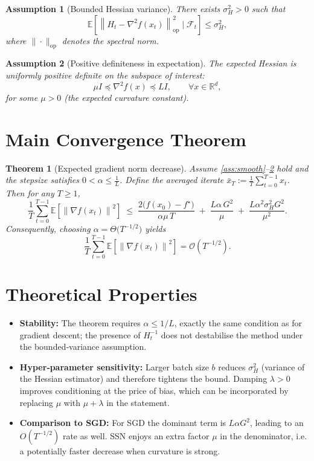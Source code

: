 \documentclass{article}
\newtheorem{assumption}{Assumption}
\newtheorem{theorem}{Theorem}
\newcommand{\E}{\mathbb{E}}
\newcommand{\R}{\mathbb{R}}
\newcommand{\norm}[1]{\left\|#1\right\|}
\begin{document}
\begin{assumption}[Bounded Hessian variance]\label{ass:varH}
There exists $\sigma_H^{2}>0$ such that
\[
\mathbb{E}\!\left[\norm{H_t-\nabla^{2}f(x_t)}^{2}_{\text{op}}\mid \mathcal{F}_t\right]\le\sigma_H^{2},
\]
where $\|\cdot\|_{\text{op}}$ denotes the spectral norm.
\end{assumption}

\begin{assumption}[Positive definiteness in expectation]\label{ass:pd}
The expected Hessian is uniformly positive definite on the subspace of interest:
\[
\mu I \preceq \nabla^{2}f(x)\preceq L I,\qquad \forall x\in\R^{d},
\]
for some $\mu>0$ (the \emph{expected curvature} constant).
\end{assumption}

\section*{Main Convergence Theorem}
\begin{theorem}[Expected gradient norm decrease]\label{thm:main}
Assume \ref{ass:smooth}--\ref{ass:pd} hold and the stepsize satisfies $0<\alpha\le \frac{1}{L}$.  
Define the averaged iterate $\bar{x}_T:=\frac{1}{T}\sum_{t=0}^{T-1}x_t$. Then for any $T\ge1$,
\[
\frac{1}{T}\sum_{t=0}^{T-1}\E\!\left[\norm{\nabla f(x_t)}^{2}\right]
\;\le\;
\frac{2\bigl(f(x_0)-f^{\star}\bigr)}{\alpha\mu\,T}
\;+\;
\frac{L\alpha\,G^{2}}{\mu}
\;+\;
\frac{L\alpha^{2}\sigma_H^{2}G^{2}}{\mu^{2}} .
\]
Consequently, choosing $\alpha = \Theta\!\bigl(T^{-1/2}\bigr)$ yields
\[
\frac{1}{T}\sum_{t=0}^{T-1}\E\!\left[\norm{\nabla f(x_t)}^{2}\right]=\mathcal{O}\!\left(T^{-1/2}\right).
\]
\end{theorem}

\section*{Theoretical Properties}
\begin{itemize}[leftmargin=*]
  \item \textbf{Stability:} The theorem requires $\alpha\le 1/L$, exactly the same condition as for gradient descent; the presence of $H_t^{-1}$ does not destabilise the method under the bounded‑variance assumption.
  \item \textbf{Hyper‑parameter sensitivity:} Larger batch size $b$ reduces $\sigma_H^{2}$ (variance of the Hessian estimator) and therefore tightens the bound. Damping $\lambda>0$ improves conditioning at the price of bias, which can be incorporated by replacing $\mu$ with $\mu+\lambda$ in the statement.
  \item \textbf{Comparison to SGD:} For SGD the dominant term is $L\alpha G^{2}$, leading to an $O(T^{-1/2})$ rate as well. SSN enjoys an extra factor $\mu$ in the denominator, i.e. a potentially faster decrease when curvature is strong.
\end{itemize}
\end{document}
